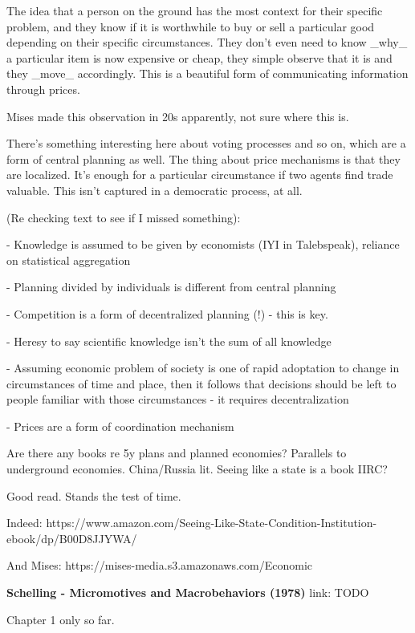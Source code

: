 \documentclass[12pt]{report}
\begin{document}
The idea that a person on the ground has the most context for their specific
problem, and they know if it is worthwhile to buy or sell a particular good
depending on their specific circumstances. They don't even need to know _why_ a
particular item is now expensive or cheap, they simple observe that it is and
they _move_ accordingly. This is a beautiful form of communicating information
through prices.

Mises made this observation in 20s apparently, not sure where this is.

There's something interesting here about voting processes and so on, which are a
form of central planning as well. The thing about price mechanisms is that they
are localized. It's enough for a particular circumstance if two agents find trade valuable. This isn't captured in a democratic process, at all.

(Re checking text to see if I missed something):

- Knowledge is assumed to be given by economists (IYI in Talebspeak), reliance on statistical aggregation

- Planning divided by individuals is different from central planning

- Competition is a form of decentralized planning (!) - this is key.

- Heresy to say scientific knowledge isn't the sum of all knowledge

- Assuming economic problem of society is one of rapid adoptation to change in circumstances of time and place, then it follows that decisions should be left to people familiar with those circumstances - it requires decentralization

- Prices are a form of coordination mechanism

Are there any books re 5y plans and planned economies? Parallels to underground economies. China/Russia lit. Seeing like a state is a book IIRC?

Good read. Stands the test of time.

Indeed: https://www.amazon.com/Seeing-Like-State-Condition-Institution-ebook/dp/B00D8JJYWA/

And Mises: https://mises-media.s3.amazonaws.com/Economic%

\textbf{Schelling - Micromotives and Macrobehaviors (1978)}
link: TODO

Chapter 1 only so far.
\end{document}
